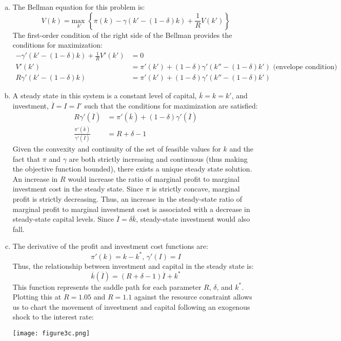 \documentclass{article}
\newcommand{\usmax}[1]{\underset{#1}{\text{max }}}
\begin{document}
\begin{enumerate}[(a)]
	\item The Bellman equation for this problem is:
		\[
			V(k) = \usmax{k'}\left\{ \pi(k) - \gamma(k'-(1-\delta)k)+\frac{1}{R}V(k') \right\}
		\]
		The first-order condition of the right side of the Bellman provides the conditions for maximization:
		\begin{align*}
			-\gamma'(k'-(1-\delta)k)+\frac{1}{R}V'(k') &= 0	\\
			V'(k') &= \pi'(k') + (1-\delta)\gamma'(k''-(1-\delta)k')\text{ (envelope condition)}	\\
			R\gamma'(k'-(1-\delta)k) &= \pi'(k') + (1-\delta)\gamma'(k''-(1-\delta)k')
		\end{align*}
	
	\item A steady state in this system is a constant level of capital, ${\overline{k}=k=k'}$, and investment, ${\overline{I}=I=I'}$ such that the conditions for maximization are satisfied:
		\begin{align*}
			R\gamma'(\overline{I}) &= \pi'(\overline{k}) + (1-\delta)\gamma'(\overline{I})	\\
			\frac{\pi'(\overline{k})}{\gamma'(\overline{I})} &= R+\delta-1
		\end{align*}
		Given the convexity and continuity of the set of feasible values for $k$ and the fact that $\pi$ and $\gamma$ are both strictly increasing and continuous (thus making the objective function bounded), there exists a unique steady state solution.
		\smallskip \\
		An increase in $R$ would increase the ratio of marginal profit to marginal investment cost in the steady state. Since $\pi$ is strictly concave, marginal profit is strictly decreasing. Thus, an increase in the steady-state ratio of marginal profit to marginal investment cost is associated with a decrease in steady-state capital levels. Since $\overline{I}=\delta\overline{k}$, steady-state investment would also fall.
	
	\item The derivative of the profit and investment cost functions are:
		\[
			\pi'(k) = k-k^*\text{, } \gamma'(I) = I
		\]
		Thus, the relationship between investment and capital in the steady state is:
		\[
			\overline{k}(\overline{I}) = (R+\delta-1)\overline{I} + k^*
		\]
		This function represents the saddle path for each parameter $R$, $\delta$, and $k^*$. Plotting this at $R=1.05$ and $R=1.1$ against the resource constraint allows us to chart the movement of investment and capital following an exogenous shock to the interest rate:
		\begin{center}
			\texttt{[image: figure3c.png]}
		\end{center}
	
\end{enumerate}
\end{document}
